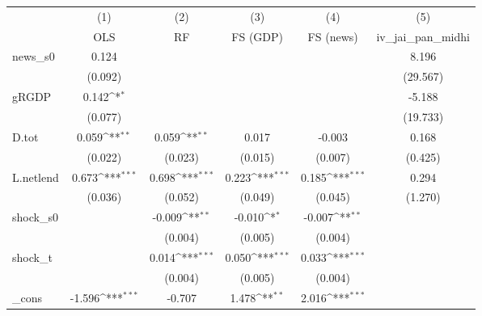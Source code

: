 {
\def\sym#1{\ifmmode^{#1}\else\(^{#1}\)\fi}
\begin{tabular}{l*{5}{c}}
\toprule
            &\multicolumn{1}{c}{(1)}&\multicolumn{1}{c}{(2)}&\multicolumn{1}{c}{(3)}&\multicolumn{1}{c}{(4)}&\multicolumn{1}{c}{(5)}\\
            &\multicolumn{1}{c}{OLS}&\multicolumn{1}{c}{RF}&\multicolumn{1}{c}{FS (GDP)}&\multicolumn{1}{c}{FS (news)}&\multicolumn{1}{c}{iv\_jai\_pan\_midhi}\\
\midrule
news\_s0     &       0.124         &                     &                     &                     &       8.196         \\
            &     (0.092)         &                     &                     &                     &    (29.567)         \\
\addlinespace
gRGDP       &       0.142\sym{*}  &                     &                     &                     &      -5.188         \\
            &     (0.077)         &                     &                     &                     &    (19.733)         \\
\addlinespace
D.tot       &       0.059\sym{**} &       0.059\sym{**} &       0.017         &      -0.003         &       0.168         \\
            &     (0.022)         &     (0.023)         &     (0.015)         &     (0.007)         &     (0.425)         \\
\addlinespace
L.netlend   &       0.673\sym{***}&       0.698\sym{***}&       0.223\sym{***}&       0.185\sym{***}&       0.294         \\
            &     (0.036)         &     (0.052)         &     (0.049)         &     (0.045)         &     (1.270)         \\
\addlinespace
shock\_s0    &                     &      -0.009\sym{**} &      -0.010\sym{*}  &      -0.007\sym{**} &                     \\
            &                     &     (0.004)         &     (0.005)         &     (0.004)         &                     \\
\addlinespace
shock\_t     &                     &       0.014\sym{***}&       0.050\sym{***}&       0.033\sym{***}&                     \\
            &                     &     (0.004)         &     (0.005)         &     (0.004)         &                     \\
\addlinespace
\_cons      &      -1.596\sym{***}&      -0.707         &       1.478\sym{**} &       2.016\sym{***}&                     \\

\end{tabular}}
